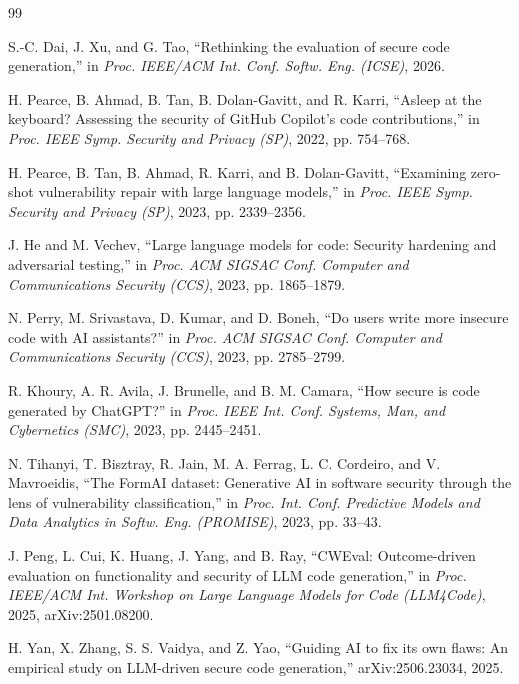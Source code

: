 \documentclass[12pt]{IEEEtran}
\begin{document}
\begin{thebibliography}{99}

S.-C. Dai, J. Xu, and G. Tao, ``Rethinking the evaluation of secure code generation,'' in \emph{Proc. IEEE/ACM Int. Conf. Softw. Eng. (ICSE)}, 2026.

H. Pearce, B. Ahmad, B. Tan, B. Dolan-Gavitt, and R. Karri, ``Asleep at the keyboard? Assessing the security of GitHub Copilot's code contributions,'' in \emph{Proc. IEEE Symp. Security and Privacy (SP)}, 2022, pp. 754--768.

H. Pearce, B. Tan, B. Ahmad, R. Karri, and B. Dolan-Gavitt, ``Examining zero-shot vulnerability repair with large language models,'' in \emph{Proc. IEEE Symp. Security and Privacy (SP)}, 2023, pp. 2339--2356.

J. He and M. Vechev, ``Large language models for code: Security hardening and adversarial testing,'' in \emph{Proc. ACM SIGSAC Conf. Computer and Communications Security (CCS)}, 2023, pp. 1865--1879.

N. Perry, M. Srivastava, D. Kumar, and D. Boneh, ``Do users write more insecure code with AI assistants?'' in \emph{Proc. ACM SIGSAC Conf. Computer and Communications Security (CCS)}, 2023, pp. 2785--2799.

R. Khoury, A. R. Avila, J. Brunelle, and B. M. Camara, ``How secure is code generated by ChatGPT?'' in \emph{Proc. IEEE Int. Conf. Systems, Man, and Cybernetics (SMC)}, 2023, pp. 2445--2451.

N. Tihanyi, T. Bisztray, R. Jain, M. A. Ferrag, L. C. Cordeiro, and V. Mavroeidis, ``The FormAI dataset: Generative AI in software security through the lens of vulnerability classification,'' in \emph{Proc. Int. Conf. Predictive Models and Data Analytics in Softw. Eng. (PROMISE)}, 2023, pp. 33--43.

J. Peng, L. Cui, K. Huang, J. Yang, and B. Ray, ``CWEval: Outcome-driven evaluation on functionality and security of LLM code generation,'' in \emph{Proc. IEEE/ACM Int. Workshop on Large Language Models for Code (LLM4Code)}, 2025, arXiv:2501.08200.

H. Yan, X. Zhang, S. S. Vaidya, and Z. Yao, ``Guiding AI to fix its own flaws: An empirical study on LLM-driven secure code generation,'' arXiv:2506.23034, 2025.


\end{thebibliography}
\end{document}
